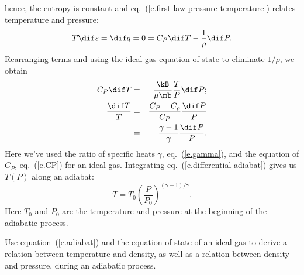  hence, the entropy is constant and eq.~(\ref{e.first-law-pressure-temperature}) relates temperature and pressure:
\begin{equation}\label{e.differential-entropy}
    T\dif s = \dif q = 0 = C_{P}\dif T - \frac{1}{\rho} \dif P.
\end{equation}
Rearranging terms and using the ideal gas equation of state to eliminate $1/\rho$, we obtain
\begin{eqnarray}
     C_{P}\dif T &=& \frac{\kB}{\mu\mb}\frac{T}{P}\dif P; \nonumber\\
     \frac{\dif T}{T} &=& \frac{C_{P}-C_{\rho}}{C_{P}} \frac{\dif P}{P}\nonumber\\
	&=& \frac{\gamma-1}{\gamma}\frac{\dif P}{P}.
\label{e.differential-adiabat}
\end{eqnarray}
Here we've used the ratio of specific heats $\gamma$, eq.~(\ref{e.gamma}), and the equation of $C_{P}$, eq.~(\ref{e.CP}) for an ideal gas.
Integrating eq.~(\ref{e.differential-adiabat}) gives us $T(P)$ along an adiabat:
\begin{equation}\label{e.adiabat}
 T = T_{0}\left(\frac{P}{P_{0}}\right)^{(\gamma-1)/\gamma}.
\end{equation}
Here $T_{0}$ and $P_{0}$ are the temperature and pressure at the beginning of the adiabatic process. 

\begin{exercisebox}
Use equation~(\ref{e.adiabat}) and the equation of state of an ideal gas to derive a relation between temperature and density, as well as a relation between density and pressure, during an adiabatic process.
\end{exercisebox}

